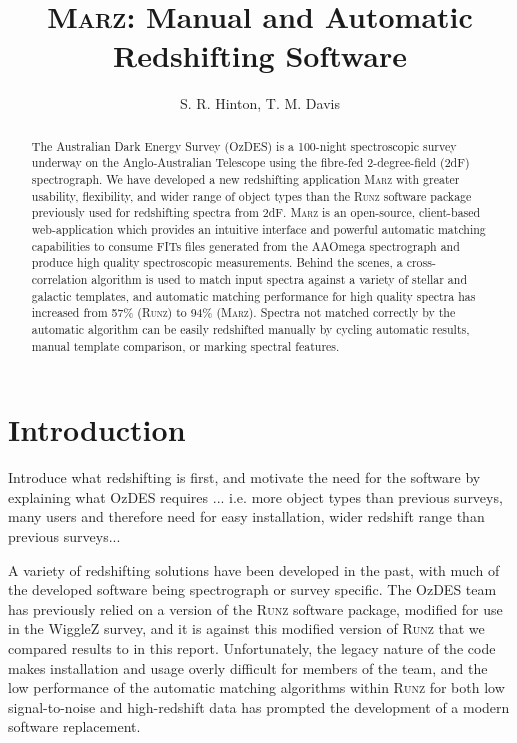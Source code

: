 \documentclass[iop]{emulateapj}
\newcommand{\tam}{\color{blue}}
\newcommand{\tamcom}{\color{red}}
\newcommand{\runz}{\textsc{Runz}}
\newcommand{\thesisname}{\textsc{Marz}}
\begin{document}
\title{\thesisname{}: Manual and Automatic Redshifting Software}

\author{S. R. Hinton, T. M. Davis}

\begin{abstract}
{\tam The Australian Dark Energy Survey (OzDES) is a 100-night spectroscopic survey underway on the Anglo-Australian Telescope using the fibre-fed 2-degree-field (2dF) spectrograph.  We have developed a new} redshifting application \thesisname{} {\tam with greater usability, flexibility, and wider range of object types than} the \runz{} software package {\tam previously used for redshifting spectra from 2dF.}  \thesisname{} is an open-source, client-based web-application which provides an intuitive interface and powerful automatic matching capabilities to consume FITs files generated from the AAOmega spectrograph and produce high quality spectroscopic measurements.  Behind the scenes, a cross-correlation algorithm is used to match input spectra against a variety of stellar and galactic templates, and automatic matching performance for high quality spectra has increased from 57\% (\runz{}) to 94\% (\thesisname{}). Spectra not matched correctly by the automatic algorithm can be easily redshifted {\tam manually} by cycling automatic results, manual template comparison, or marking spectral features.
\end{abstract}

\section{Introduction}

{\tamcom Introduce what redshifting is first, and motivate the need for the software by explaining what OzDES requires ... i.e. more object types than previous surveys, many users and therefore need for easy installation, wider redshift range than previous surveys...}
 
A variety of redshifting solutions have been developed in the past, with much of the developed software being spectrograph or survey specific. The OzDES team has previously relied on a version of the \runz{} software package, modified for use in the WiggleZ survey, and it is against this modified version of \runz{} that we compared results to in this report. Unfortunately, the legacy nature of the code makes installation and usage overly difficult for members of the team, and the low performance of the automatic matching algorithms within \runz{} for both low signal-to-noise and high-redshift data has prompted the development of a modern software replacement.\\
\end{document}
